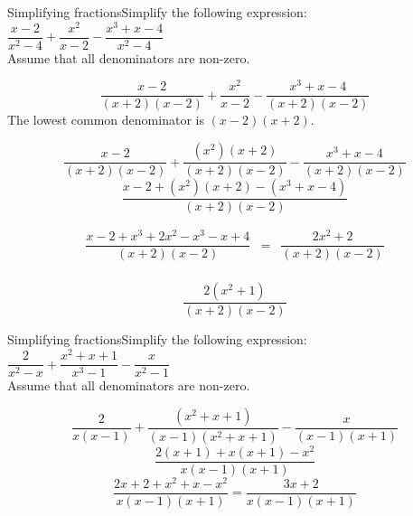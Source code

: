 %      
\begin{wex}{Simplifying fractions}{Simplify the following expression: $\dfrac{x-2}{{x}^{2}-4}+\dfrac{{x}^{2}}{x-2}-\dfrac{{x}^{3}+x-4}{{x}^{2}-4}$ \\
Assume that all denominators are non-zero.}
{
\begin{equation*}
\frac{x-2}{\left(x+2\right)\left(x-2\right)}+\frac{{x}^{2}}{x-2}-\frac{{x}^{3}+x-4}{\left(x+2\right)\left(x-2\right)}
\end{equation*}
 The lowest common denominator is $\left(x-2\right)\left(x+2\right)$.\par 
\label{m39392*id27943653977}\nopagebreak\noindent{}
\begin{equation*}
\frac{x-2}{\left(x+2\right)\left(x-2\right)}+\frac{\left({x}^{2}\right)
\left(x+2\right)}{\left(x+2\right)\left(x-2\right)}-\frac{{x}^{3}+x-4}{\left(x+2\right)\left(x-2\right)}
\end{equation*}
\begin{equation*}
\frac{x-2+({x}^{2})(x+2)-(x^{3}+x-4)}{(x+2)(x-2)}
\end{equation*}

\begin{equation*}
 \begin{array}{llll}
\dfrac{x-2+{x}^{3}+ 2x^{2}-x^{3} - x+4}{(x+2)(x-2)} & = & \dfrac{2x^{2} + 2}{(x+2)(x-2)}\\
\end{array}
\end{equation*}

\begin{equation*}
\dfrac{2\left({x}^{2}
+1\right)}{\left(x+2\right)\left(x-2\right)}
\end{equation*}
}
\end{wex}

\begin{wex}{Simplifying fractions}{Simplify the following expression: $\dfrac{2}{{x}^{2}-x}+\dfrac{x^{2}+x+1}{x^{3}-1}-\dfrac{x}{{x}^{2}-1}$ \\
Assume that all denominators are non-zero.}
{
\begin{equation*}
\dfrac{2}{x(x-1)}+ \dfrac{({x}^{2} + x + 1)}{(x-1)(x^{2}+x+1)}-\dfrac{x}{(x-1)(x+1)}
\end{equation*}
\begin{equation*}
\dfrac{2(x+1)+x(x+1)-x^{2}}{x(x-1)(x+1)}
\end{equation*}
\begin{equation*}
\dfrac{2x+2 + x^{2} + x - x^{2}}{x(x-1)(x+1)} = \dfrac{3x+2}{x(x-1)(x+1)}
\end{equation*}



}
\end{wex}


